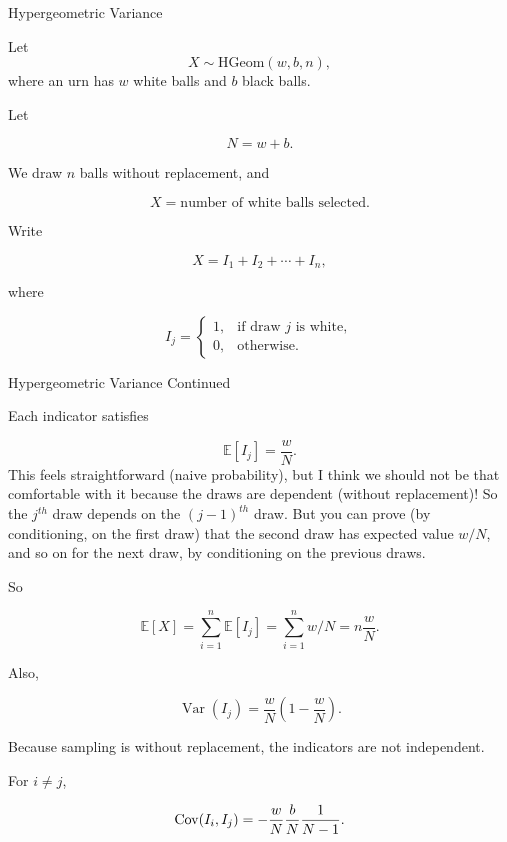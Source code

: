 
\begin{frame}{Hypergeometric Variance}

Let
\[
X\sim \text{HGeom}(w,b,n),
\]
where an urn has $w$ white balls and $b$ black balls.

Let

\[
N=w+b.
\]

We draw $n$ balls without replacement, and

\[
X=\text{number of white balls selected}.
\]

Write

\[
X=I_1+I_2+\cdots+I_n,
\]

where

\[
I_j=
\begin{cases}
1, & \text{if draw } j \text{ is white},\\
0, & \text{otherwise}.
\end{cases}
\]

\end{frame}


\begin{frame}{Hypergeometric Variance Continued}

Each indicator satisfies

\[
\mathbb{E}[I_j]=\frac{w}{N}.
\]
This feels straightforward (naive probability), but I think we should not be that comfortable with it because the draws are dependent (without replacement)! So the $j^{th}$ draw depends on the $(j-1)^{th}$ draw. But you can prove (by conditioning, on the first draw) that the second draw has expected value $w/N$, and so on for the next draw, by conditioning on the previous draws.

So

\[
\mathbb{E}[X]=\sum_{i=1}^n  \mathbb{E} [I_j] = \sum_{i=1}^n w/N=    n\frac{w}{N}.
\]

Also,

\[
\operatorname{Var}(I_j)=\frac{w}{N}\left(1-\frac{w}{N}\right).
\]

Because sampling is without replacement, the indicators are not independent.

For $i\neq j$,

\[
\operatorname{Cov}(I_i,I_j)
=
-\frac{w}{N}\frac{b}{N}\frac{1}{N-1}.
\]

\end{frame}


